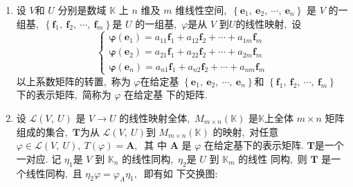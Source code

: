 \begin{enumerate}
		\item 设 $ V  $和  $U$  分别是数域 $ \mathbb{K} $ 上 $ n$  维及 $ m$  维线性空间,\   $\left\{\boldsymbol{e}_{1},\  \boldsymbol{e}_{2},\  \cdots,\  \boldsymbol{e}_{n}\right\}$  是  $V $ 的一组基,\   $\left\{\boldsymbol{f}_{1},\  \boldsymbol{f}_{2},\  \cdots,\  \boldsymbol{f}_{m}\right\}  $是  $U$  的一组基,\ $  \varphi  $是从  $V $ 到$  U  $的线性映射,\  设
		$$\left\{\begin{array}{c}
			\boldsymbol{\varphi}\left(\boldsymbol{e}_{1}\right)=a_{11} \boldsymbol{f}_{1}+a_{12} \boldsymbol{f}_{2}+\cdots+a_{1 m} \boldsymbol{f}_{m} \\
			\boldsymbol{\varphi}\left(\boldsymbol{e}_{2}\right)=a_{21} \boldsymbol{f}_{1}+a_{22} \boldsymbol{f}_{2}+\cdots+a_{2 m} \boldsymbol{f}_{m} \\
			\boldsymbol{\varphi}\left(\boldsymbol{e}_{n}\right)=a_{n1} \boldsymbol{f}_{1}+a_{n2} \boldsymbol{f}_{2}+\cdots+a_{n m} \boldsymbol{f}_{m}
		\end{array}\right.$$
		以上系数矩阵的转置,\  称为 $ \varphi  $在给定基  $\left\{\boldsymbol{e}_{1},\  \boldsymbol{e}_{2},\  \cdots,\  \boldsymbol{e}_{n}\right\}  $和 $ \left\{\boldsymbol{f}_{1},\  \boldsymbol{f}_{2},\  \cdots,\  \boldsymbol{f}_{m}\right\}$  下的表示矩阵,\  简称为  $\varphi $ 在给定基 下的矩阵.
		\item 设  $\mathcal{L}(V,\  U)$ 是  $V \rightarrow U$  的线性映射全体,\   $M_{m \times n}(\mathbb{K})$  是$  \mathbb{K}  $上全体 $ m \times n$ 矩阵组成的集合,\  $ \boldsymbol{T}  $为从 $ \mathcal{L}(V,\  U)  $到 $ M_{m \times n}(\mathbb{K}) $ 的映射,\  对任意$  \varphi \in \mathcal{L}(V,\  U),\  T(\varphi)=\boldsymbol{A} ,\ $ 其 中  $\boldsymbol{A}$  是 $ \varphi $ 在给定基下的表示矩阵. $\boldsymbol{T}  $是一个一对应. 记  $\eta_{1}  $是  $V$  到  $\mathbb{K}_{n} $ 的线性同构,\  $ \eta_{2}  $是 $ U$  到  $\mathbb{K}_{m} $ 的线性 同构,\  则  $\boldsymbol{T}$ 是一个线性同构,\  且  $\eta_{2} \varphi=\varphi_{A} \eta_{1} ,\ $ 即有如 下交换图:
		

\end{enumerate}
